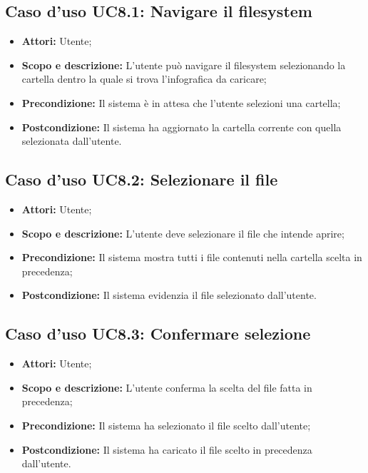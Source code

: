 \subsection{Caso d'uso UC8.1: Navigare il filesystem}
\begin{itemize}
	\item \textbf{Attori:} Utente;
	\item \textbf{Scopo e descrizione:} L'utente può navigare il \gls{filesystem} selezionando la cartella dentro la quale si trova l'\gls{infografica} da caricare;
	\item \textbf{Precondizione:} Il sistema è in attesa che l'utente selezioni una cartella;
	\item \textbf{Postcondizione:} Il sistema ha aggiornato la cartella corrente con quella selezionata dall'utente.
\end{itemize}

\subsection{Caso d'uso UC8.2: Selezionare il file}
\begin{itemize}
	\item \textbf{Attori:} Utente;
	\item \textbf{Scopo e descrizione:} L'utente deve selezionare il file che intende aprire;
	\item \textbf{Precondizione:} Il sistema mostra tutti i file contenuti nella cartella scelta in precedenza;
	\item \textbf{Postcondizione:} Il sistema evidenzia il file selezionato dall'utente.
\end{itemize}

\subsection{Caso d'uso UC8.3: Confermare selezione}
\begin{itemize}
	\item \textbf{Attori:} Utente;
	\item \textbf{Scopo e descrizione:} L'utente conferma la scelta del file fatta in precedenza;
	\item \textbf{Precondizione:} Il sistema ha selezionato il file scelto dall'utente;
	\item \textbf{Postcondizione:} Il sistema ha caricato il file scelto in precedenza dall'utente.
\end{itemize}